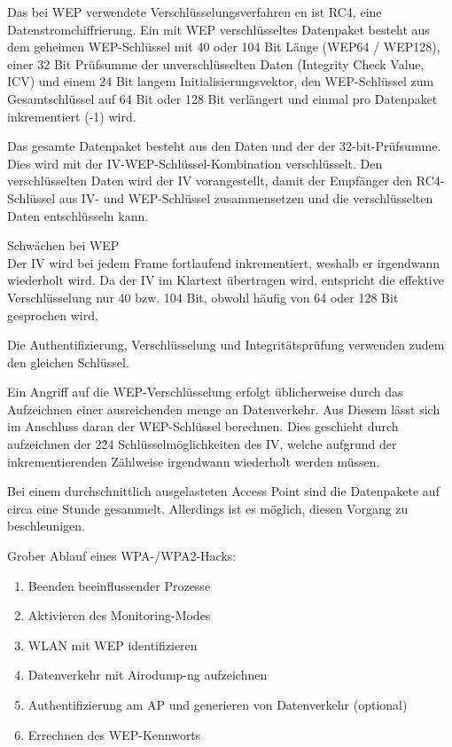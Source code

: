 Das bei WEP verwendete Verschlüsselungsverfahren en ist RC4, eine Datenstromchiffrierung.  Ein mit WEP verschlüsseltes Datenpaket besteht aus dem geheimen WEP-Schlüssel mit 40 oder 104 Bit Länge (WEP64 / WEP128), einer 32 Bit Prüfsumme der unverschlüsselten Daten (Integrity Check Value, ICV) und einem 24 Bit langem Initialisierungsvektor,  den WEP-Schlüssel zum Gesamtschlüssel auf 64 Bit oder 128 Bit verlängert und einmal pro Datenpaket inkrementiert (-1) wird. 

Das gesamte Datenpaket besteht aus den Daten und der der 32-bit-Prüfsumme. Dies wird mit der IV-WEP-Schlüssel-Kombination verschlüsselt. Den verschlüsselten Daten wird der IV vorangestellt, damit der Empfänger den RC4-Schlüssel aus IV- und WEP-Schlüssel zusammensetzen und die verschlüsselten Daten entschlüsseln kann.

{\Large Schwächen bei WEP}\\
Der IV wird bei jedem Frame fortlaufend inkrementiert, weshalb er irgendwann wiederholt wird. 
Da der IV im Klartext übertragen wird, entspricht die effektive Verschlüsselung nur 40 bzw. 104 Bit, obwohl häufig von 64 oder 128 Bit gesprochen wird.

Die Authentifizierung, Verschlüsselung und Integritätsprüfung verwenden zudem den gleichen Schlüssel. 

Ein Angriff auf die WEP-Verschlüsselung erfolgt üblicherweise durch das Aufzeichnen einer ausreichenden menge an Datenverkehr. Aus Diesem lässt sich im Anschluss daran der WEP-Schlüssel berechnen. Dies geschieht durch aufzeichnen der 2\^24 Schlüsselmöglichkeiten des IV, welche aufgrund der inkrementierenden Zählweise irgendwann wiederholt werden müssen. 

Bei einem durchschnittlich ausgelasteten Access Point sind die Datenpakete auf circa eine Stunde gesammelt. Allerdings ist es möglich, diesen Vorgang zu beschleunigen. 

Grober Ablauf eines WPA-/WPA2-Hacks:

\begin{enumerate}
\item Beenden beeinflussender Prozesse
\item Aktivieren des Monitoring-Modes
\item WLAN mit WEP identifizieren
\item Datenverkehr mit Airodump-ng aufzeichnen
\item Authentifizierung am AP und generieren von Datenverkehr (optional)
\item Errechnen des WEP-Kennworts
\end{enumerate}

